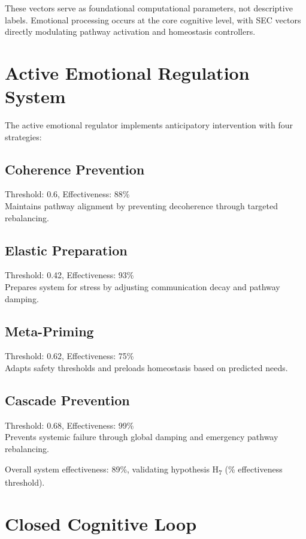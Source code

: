 \documentclass[12pt,a4paper]{article}
\begin{document}
These vectors serve as foundational computational parameters, not descriptive labels. Emotional processing occurs at the core cognitive level, with SEC vectors directly modulating pathway activation and homeostasis controllers.

\section{Active Emotional Regulation System}

The active emotional regulator implements anticipatory intervention with four strategies:

\subsection{Coherence Prevention}
Threshold: 0.6, Effectiveness: 88\% \\
Maintains pathway alignment by preventing decoherence through targeted rebalancing.

\subsection{Elastic Preparation}
Threshold: 0.42, Effectiveness: 93\% \\
Prepares system for stress by adjusting communication decay and pathway damping.

\subsection{Meta-Priming}
Threshold: 0.62, Effectiveness: 75\% \\
Adapts safety thresholds and preloads homeostasis based on predicted needs.

\subsection{Cascade Prevention}
Threshold: 0.68, Effectiveness: 99\% \\
Prevents systemic failure through global damping and emergency pathway rebalancing.

Overall system effectiveness: 89\%, validating hypothesis H\textsubscript{7} (\% effectiveness threshold).

\section{Closed Cognitive Loop}
\end{document}
